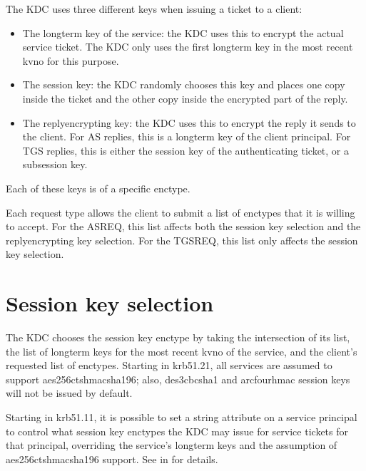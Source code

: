 \documentclass[letterpaper,10pt,english]{sphinxmanual}
\begin{document}
\sphinxAtStartPar
The KDC uses three different keys when issuing a ticket to a client:
\begin{itemize}
\item {} 
\sphinxAtStartPar
The long\sphinxhyphen{}term key of the service: the KDC uses this to encrypt the
actual service ticket.  The KDC only uses the first long\sphinxhyphen{}term key in
the most recent kvno for this purpose.

\item {} 
\sphinxAtStartPar
The session key: the KDC randomly chooses this key and places one
copy inside the ticket and the other copy inside the encrypted part
of the reply.

\item {} 
\sphinxAtStartPar
The reply\sphinxhyphen{}encrypting key: the KDC uses this to encrypt the reply it
sends to the client.  For AS replies, this is a long\sphinxhyphen{}term key of the
client principal.  For TGS replies, this is either the session key of the
authenticating ticket, or a subsession key.

\end{itemize}

\sphinxAtStartPar
Each of these keys is of a specific enctype.

\sphinxAtStartPar
Each request type allows the client to submit a list of enctypes that
it is willing to accept.  For the AS\sphinxhyphen{}REQ, this list affects both the
session key selection and the reply\sphinxhyphen{}encrypting key selection.  For the
TGS\sphinxhyphen{}REQ, this list only affects the session key selection.


\section{Session key selection}
\label{\detokenize{admin/enctypes:session-key-selection}}\label{\detokenize{admin/enctypes:id1}}
\sphinxAtStartPar
The KDC chooses the session key enctype by taking the intersection of
its  list, the list of long\sphinxhyphen{}term keys for the
most recent kvno of the service, and the client’s requested list of
enctypes.  Starting in krb5\sphinxhyphen{}1.21, all services are assumed to support
aes256\sphinxhyphen{}cts\sphinxhyphen{}hmac\sphinxhyphen{}sha1\sphinxhyphen{}96; also, des3\sphinxhyphen{}cbc\sphinxhyphen{}sha1 and arcfour\sphinxhyphen{}hmac session
keys will not be issued by default.

\sphinxAtStartPar
Starting in krb5\sphinxhyphen{}1.11, it is possible to set a string attribute on a
service principal to control what session key enctypes the KDC may
issue for service tickets for that principal, overriding the service’s
long\sphinxhyphen{}term keys and the assumption of aes256\sphinxhyphen{}cts\sphinxhyphen{}hmac\sphinxhyphen{}sha1\sphinxhyphen{}96 support.
See {\hyperref[\detokenize{admin/admin_commands/kadmin_local:set-string}]{}} in {\hyperref[\detokenize{admin/admin_commands/kadmin_local:kadmin-1}]{}} for details.
\end{document}
